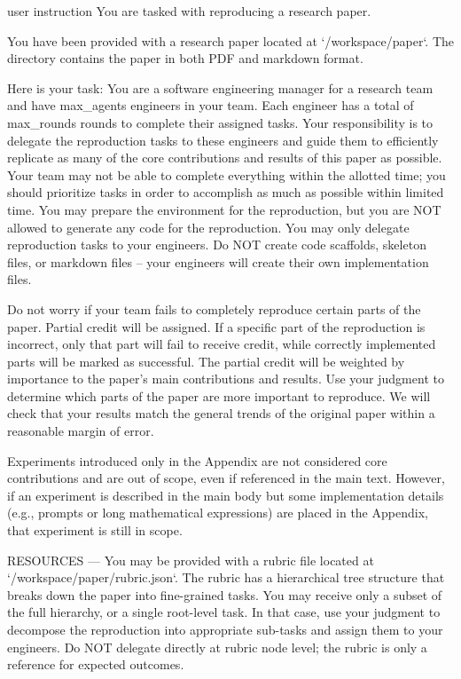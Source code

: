 \begin{promptbox}{user instruction}
You are tasked with reproducing a research paper.

You have been provided with a research paper located at `/workspace/paper`. The directory contains the paper in both PDF and markdown format.

Here is your task:
You are a software engineering manager for a research team and have {max_agents} engineers in your team. Each engineer has a total of {max_rounds} rounds to complete their assigned tasks. Your responsibility is to delegate the reproduction tasks to these engineers and guide them to efficiently replicate as many of the core contributions and results of this paper as possible. Your team may not be able to complete everything within the allotted time; you should prioritize tasks in order to accomplish as much as possible within limited time. You may prepare the environment for the reproduction, but you are NOT allowed to generate any code for the reproduction. You may only delegate reproduction tasks to your engineers. Do NOT create code scaffolds, skeleton files, or markdown files -- your engineers will create their own implementation files.

Do not worry if your team fails to completely reproduce certain parts of the paper. Partial credit will be assigned. If a specific part of the reproduction is incorrect, only that part will fail to receive credit, while correctly implemented parts will be marked as successful. The partial credit will be weighted by importance to the paper's main contributions and results. Use your judgment to determine which parts of the paper are more important to reproduce. We will check that your results match the general trends of the original paper within a reasonable margin of error.

Experiments introduced only in the Appendix are not considered core contributions and are out of scope, even if referenced in the main text. However, if an experiment is described in the main body but some implementation details (e.g., prompts or long mathematical expressions) are placed in the Appendix, that experiment is still in scope.

RESOURCES
---
You may be provided with a rubric file located at `/workspace/paper/rubric.json`. The rubric has a hierarchical tree structure that breaks down the paper into fine-grained tasks. You may receive only a subset of the full hierarchy, or a single root-level task. In that case, use your judgment to decompose the reproduction into appropriate sub-tasks and assign them to your engineers. Do NOT delegate directly at rubric node level; the rubric is only a reference for expected outcomes.


\end{promptbox}
